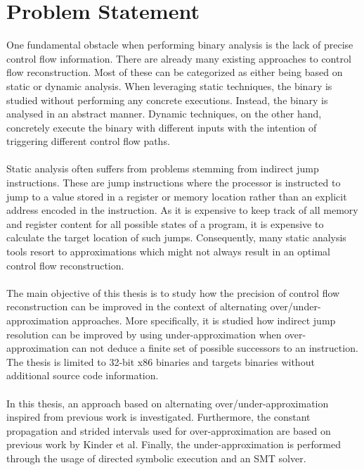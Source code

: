 \documentclass{kththesis}
\begin{document}
\section{Problem Statement}
One fundamental obstacle when performing binary analysis is the lack of precise control flow information\cite{preciseCFGBoolean}. There are already many existing approaches to control flow reconstruction. Most of these can be categorized as either being based on static or dynamic analysis. When leveraging static techniques, the binary is studied without performing any concrete executions. Instead, the binary is analysed in an abstract manner. Dynamic techniques, on the other hand, concretely execute the binary with different inputs with the intention of triggering different control flow paths. 
\\ \\ 
Static analysis often suffers from problems stemming from indirect jump instructions. These are jump instructions where the processor is instructed to jump to a value stored in a register or memory location rather than an explicit address encoded in the instruction. As it is expensive to keep track of all memory and register content for all possible states of a program, it is expensive to calculate the target location of such jumps. Consequently, many static analysis tools resort to approximations which might not always result in an optimal control flow reconstruction.
\\ \\
The main objective of this thesis is to study how the precision of control flow reconstruction can be improved in the context of alternating over/under-approximation approaches. More specifically, it is studied how indirect jump resolution can be improved by using under-approximation when over-approximation can not deduce a finite set of possible successors to an instruction. The thesis is limited to 32-bit x86 binaries and targets binaries without additional source code information.
\\ \\
In this thesis, an approach based on alternating over/under-approximation inspired from previous work\cite{alternating} is investigated. Furthermore, the constant propagation and strided intervals used for over-approximation are based on previous work by Kinder et al\cite{Jakstab}. Finally, the under-approximation is performed through the usage of directed symbolic execution and an SMT solver. 
\end{document}
